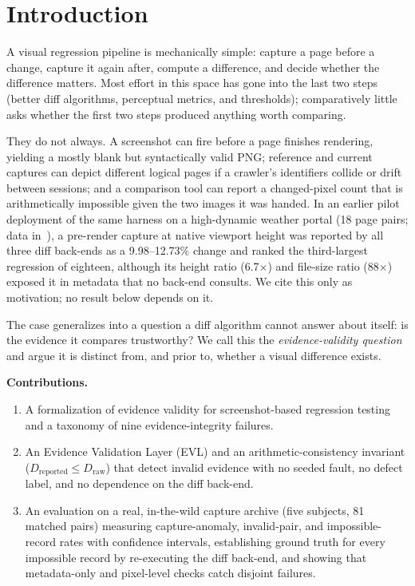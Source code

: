 \documentclass[conference]{IEEEtran}
\newcommand{\Dr}{D_{\mathrm{reported}}}
\newcommand{\Dw}{D_{\mathrm{raw}}}
\begin{document}
\section{Introduction}
A visual regression pipeline is mechanically simple: capture a page before a change, capture it again after, compute a difference, and decide whether the difference matters. Most effort in this space has gone into the last two steps (better diff algorithms, perceptual metrics, and thresholds); comparatively little asks whether the first two steps produced anything worth comparing.

They do not always. A screenshot can fire before a page finishes rendering, yielding a mostly blank but syntactically valid PNG; reference and current captures can depict different logical pages if a crawler's identifiers collide or drift between sessions; and a comparison tool can report a changed-pixel count that is arithmetically impossible given the two images it was handed. In an earlier pilot deployment of the same harness on a high-dynamic weather portal (18 page pairs; data in~\cite{avqrepo}), a pre-render capture at native viewport height was reported by all three diff back-ends as a 9.98--12.73\% change and ranked the third-largest regression of eighteen, although its height ratio (6.7$\times$) and file-size ratio (88$\times$) exposed it in metadata that no back-end consults. We cite this only as motivation; no result below depends on it.

The case generalizes into a question a diff algorithm cannot answer about itself: is the evidence it compares trustworthy? We call this the \emph{evidence-validity question} and argue it is distinct from, and prior to, whether a visual difference exists.

\textbf{Contributions.}
\begin{enumerate}
\item A formalization of evidence validity for screenshot-based regression testing and a taxonomy of nine evidence-integrity failures.
\item An Evidence Validation Layer (EVL) and an arithmetic-consistency invariant ($\Dr \le \Dw$) that detect invalid evidence with no seeded fault, no defect label, and no dependence on the diff back-end.
\item An evaluation on a real, in-the-wild capture archive (five subjects, 81 matched pairs) measuring capture-anomaly, invalid-pair, and impossible-record rates with confidence intervals, establishing ground truth for every impossible record by re-executing the diff back-end, and showing that metadata-only and pixel-level checks catch disjoint failures.
\end{enumerate}
\end{document}
